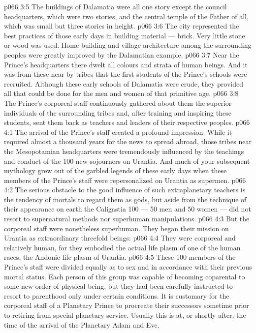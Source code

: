 \vs p066 3:5 The buildings of Dalamatia were all one story except the council headquarters, which were two stories, and the central temple of the Father of all, which was small but three stories in height.
\vs p066 3:6 The city represented the best practices of those early days in building material --- brick. Very little stone or wood was used. Home building and village architecture among the surrounding peoples were greatly improved by the Dalamatian example.
\vs p066 3:7 \pc Near the Prince’s headquarters there dwelt all colours and strata of human beings. And it was from these near-by tribes that the first students of the Prince’s schools were recruited. Although these early schools of Dalamatia were crude, they provided all that could be done for the men and women of that primitive age.
\vs p066 3:8 The Prince’s corporeal staff continuously gathered about them the superior individuals of the surrounding tribes and, after training and inspiring these students, sent them back as teachers and leaders of their respective peoples.
\vs p066 4:1 The arrival of the Prince’s staff created a profound impression. While it required almost a thousand years for the news to spread abroad, those tribes near the Mesopotamian headquarters were tremendously influenced by the teachings and conduct of the 100 new sojourners on Urantia. And much of your subsequent mythology grew out of the garbled legends of these early days when these members of the Prince’s staff were repersonalized on Urantia as supermen.
\vs p066 4:2 The serious obstacle to the good influence of such extraplanetary teachers is the tendency of mortals to regard them as gods, but aside from the technique of their appearance on earth the Caligastia 100 --- 50 men and 50 women --- did not resort to supernatural methods nor superhuman manipulations.
\vs p066 4:3 But the corporeal staff were nonetheless superhuman. They began their mission on Urantia as extraordinary threefold beings:
\vs p066 4:4 \bibnobreakspace They were corporeal and relatively human, for they embodied the actual life plasm of one of the human races, the Andonic life plasm of Urantia.
\vs p066 4:5 These 100 members of the Prince’s staff were divided equally as to sex and in accordance with their previous mortal status. Each person of this group was capable of becoming coparental to some new order of physical being, but they had been carefully instructed to resort to parenthood only under certain conditions. It is customary for the corporeal staff of a Planetary Prince to procreate their successors sometime prior to retiring from special planetary service. Usually this is at, or shortly after, the time of the arrival of the Planetary Adam and Eve.
